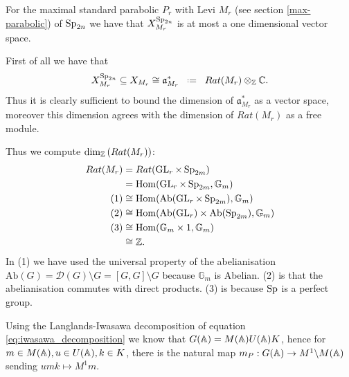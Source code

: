 \begin{example}\label{ex:characters}
    For the maximal standard parabolic \(P_r\) with Levi \(M_r\) (see section \ref{max-parabolic}) of \(\operatorname{Sp}_{2n}\) we have that \( X_{M_r}^{\operatorname{Sp}_{2n}}\) is at most a one dimensional \C vector space. 

    First of all we have that \cite[I.1.4]{moeglinSpectralDecompositionEisenstein1995}
         \[ X_{M_r}^{\Sp_{2n}} \subseteq X_{M_r} \cong \mathfrak{a}_{M_r}^*\defeq Rat(M_r) \tensor_\Z \C.\]
        Thus it is clearly sufficient to bound the dimension of \(\mathfrak{a}_{M_r}^*\) as a \C vector space, moreover this dimension agrees with the dimension of \(Rat(M_r)\) as a free \Z module. 

        Thus we compute \(\dim_\Z(Rat(M_r))\):
        \begin{equation*}
            \begin{aligned}
                Rat(M_r) &= Rat(\GL_r \times \Sp_{2m}) \\
                         &= \Hom(\GL_r \times \Sp_{2m}, \mathbb{G}_m) \\
                         (1)&\cong \Hom(\mathrm{Ab}(\GL_r \times \Sp_{2m}), \mathbb{G}_m) \\
                         (2)&\cong \Hom(\mathrm{Ab}(\GL_r) \times \mathrm{Ab}(\Sp_{2m}), \mathbb{G}_m) \\
                         (3)&\cong \Hom(\mathbb{G}_m \times 1, \mathbb{G}_m) \\
                         &\cong \Z.
            \end{aligned}
        \end{equation*}
        In (1) we have used the universal property of the abelianisation \(\mathrm{Ab}(G) = \mathcal{D}(G) \setminus G = [G, G] \setminus G \) because \(\mathbb{G}_m\) is Abelian. (2) is that the abelianisation commutes with direct products. (3) is because \(\operatorname{Sp}\) is a perfect group.
\end{example}


Using the Langlands-Iwasawa decomposition of equation \ref{eq:iwasawa_decomposition} we know that \(G(\A) = M(\A)U(\A)K\), hence for \(m\in M(\A), u\in U(\A), k\in K\), there is the natural map \(m_P: G(\A) \to M^1 \backslash M(\A)\) sending \(umk \mapsto M^1 m\).

